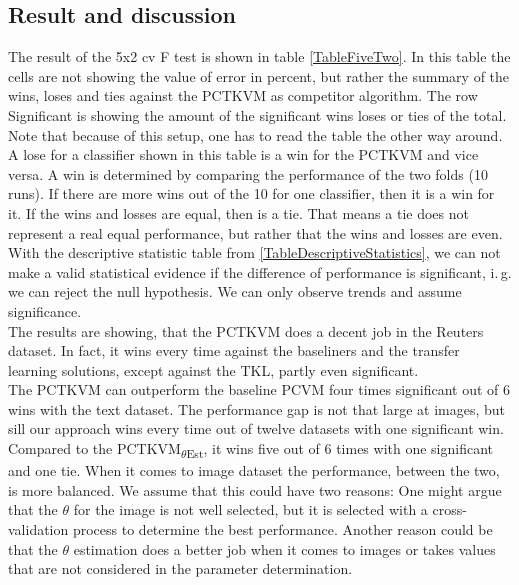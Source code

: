 \subsection{Result and discussion}\label{EmSubSecResOneDa}
The result of the 5x2 cv F test is shown in table \ref{TableFiveTwo}.
In this table the cells are not showing the value of error in percent, but rather the summary of the wins,  loses and ties against the \acs{PCTKVM} as competitor algorithm.
The row Significant is showing the amount of the significant wins loses or ties of the total.
Note that because of this setup, one has to read the table the other way around. 
A lose for a classifier shown in this table is a win for the \acs{PCTKVM} and vice versa. 
A win is determined by comparing the performance of the two folds (10 runs).
If there are more wins out of the 10 for one classifier, then it is a win for it. If the wins and losses are equal, then is a tie. 
That means a tie does not represent a real equal performance, but rather that the wins and losses are even.\\
With the descriptive statistic table from \ref{TableDescriptiveStatistics}, we can not make a valid statistical evidence if the difference of performance is significant, i.\,g. we can reject the null hypothesis.\cite[p. 9]{JanezDemsar.2006}
We can only observe trends and assume significance.\\
The results are showing, that the \acs{PCTKVM} does a decent job in the Reuters dataset.
In fact, it wins every time against the baseliners and the transfer learning solutions, except against the \acs{TKL}, partly even significant.\\
The \acs{PCTKVM} can outperform the baseline \acs{PCVM} four times significant out of 6 wins with the text dataset.
The performance gap is not that large at images, but sill our approach wins every time out of twelve datasets with one significant win.\\
Compared to the \acs{PCTKVM}\textsubscript{$\theta$Est}, it wins five out of 6 times with one significant and one tie. 
When it comes to image dataset the performance, between the two, is more balanced.
We assume that this could have two reasons:
One might argue that the $\theta$ for the image is not well selected, but it is selected with a cross-validation process to determine the best performance. Another reason could be that the $\theta$ estimation does a better job when it comes to images or takes values that are not considered in the parameter determination.\\

